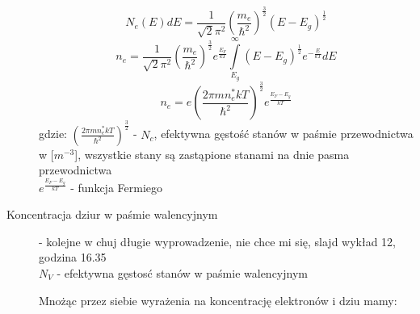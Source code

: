 \documentclass[a4paper,11pt]{article}
\begin{document}
\begin{description}
  $$N_e(E)dE=\frac{1}{\sqrt{2}\pi^2}\left(\frac{m_e}{\hbar^2}\right)^\frac{3}{2}\left(E-E_g\right)^\frac{1}{2}$$
  $$n_e = \frac{1}{\sqrt{2}\pi^2}\left(\frac{m_e}{\hbar^2}\right)^\frac{3}{2}e^\frac{E_F}{kT}\int\limits^\infty_{E_g}\left(E-E_g\right)^\frac{1}{2}e^{-\frac{E}{kT}}dE$$
  $$n_e=e\left(\frac{2\pi mn^*_ekT}{\hbar^2}\right)^\frac{3}{2}e^\frac{E_F-E_g}{kT}$$
  gdzie: $\left(\frac{2\pi mn^*_ekT}{\hbar^2}\right)^\frac{3}{2}$ - $N_c$, efektywna gęstość stanów w paśmie przewodnictwa w [$m^{-3}$], wszystkie stany są zastąpione stanami na dnie pasma przewodnictwa \\
  $e^\frac{E_F-E_g}{kT}$ - funkcja Fermiego
\item[Koncentracja dziur w paśmie walencyjnym] - kolejne w chuj długie wyprowadzenie, nie chce mi się, slajd wykład 12, godzina 16.35\\
  $N_V$ - efektywna gęstosć stanów w paśmie walencyjnym

  Mnożąc przez siebie wyrażenia na koncentrację elektronów i dziu mamy:


\end{description}
\end{document}
